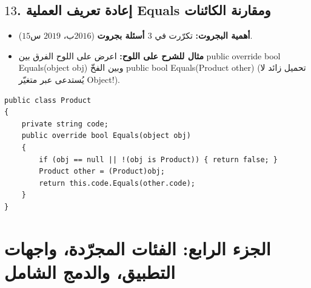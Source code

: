 \documentclass[14pt]{extarticle}
\begin{document}
\filbreak
\subsection*{$13$. إعادة تعريف العملية \textenglish{Equals} ومقارنة الكائنات}
\begin{itemize}[itemsep=0.25em]
    \item \textbf{أهمية البجروت:} تكرّرت في \textbf{$3$ أسئلة بجروت} ($2016$ب، $2019$ س$15$).
    \item \textbf{مثال للشرح على اللوح:} اعرض على اللوح الفرق بين \textenglish{public override bool Equals(object obj)} وبين الفخّ \textenglish{public bool Equals(Product other)} (تحميل زائد لا يُستدعى عبر متغيّر \textenglish{Object}!).
\end{itemize}
\begin{boxCode}
\begin{english}
\begin{verbatim}
public class Product
{
    private string code;
    public override bool Equals(object obj)
    {
        if (obj == null || !(obj is Product)) { return false; }
        Product other = (Product)obj;
        return this.code.Equals(other.code);
    }
}
\end{verbatim}
\end{english}
\end{boxCode}

\clearpage
\section*{الجزء الرابع: الفئات المجرّدة، واجهات التطبيق، والدمج الشامل}
\end{document}
